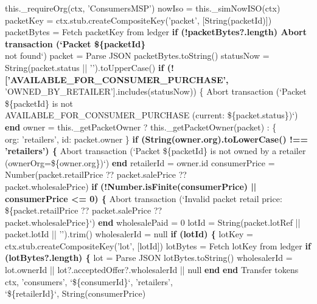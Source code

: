 \documentclass[12pt]{article}
\begin{document}
\begin{algorithm}[H]
\caption{purchasePacket() (Part 1 of 3)}
this.\_requireOrg(ctx, 'ConsumersMSP')\;
nowIso = this.\_simNowISO(ctx)\;
packetKey = ctx.stub.createCompositeKey('packet', [String(packetId)])\;
packetBytes = Fetch packetKey from ledger\;
\textbf{if (!packetBytes?.length) Abort transaction (`Packet \$\{packetId\}}\\
\quad not found`)\;
packet = Parse JSON packetBytes.toString()\;
statusNow = String(packet.status || '').toUpperCase()\;
\textbf{if (!['AVAILABLE\_FOR\_CONSUMER\_PURCHASE',}\\
\quad 'OWNED\_BY\_RETAILER'].includes(statusNow)) \{\;
Abort transaction (`Packet \$\{packetId\} is not\\
\quad AVAILABLE\_FOR\_CONSUMER\_PURCHASE (current: \$\{packet.status\})`)\;
\textbf{end}\;
owner = this.\_getPacketOwner ? this.\_getPacketOwner(packet) : \{\\
\quad org: 'retailers', id: packet.owner \}\;
\textbf{if (String(owner.org).toLowerCase() !== 'retailers') \{}\;
Abort transaction (`Packet \$\{packetId\} is not owned by a retailer\\
\quad (ownerOrg=\$\{owner.org\})`)\;
\textbf{end}\;
retailerId = owner.id\;
consumerPrice = Number(packet.retailPrice ?? packet.salePrice ??\\
\quad packet.wholesalePrice)\;
\textbf{if (!Number.isFinite(consumerPrice) || consumerPrice <= 0) \{}\;
Abort transaction (`Invalid packet retail price:\\
\quad \$\{packet.retailPrice ?? packet.salePrice ??\\
\quad packet.wholesalePrice\}`)\;
\textbf{end}\;
wholesalePaid = 0\;
lotId = String(packet.lotRef || packet.lotId || '').trim()\;
wholesalerId = null\;
\textbf{if (lotId) \{}\;
lotKey = ctx.stub.createCompositeKey('lot', [lotId])\;
lotBytes = Fetch lotKey from ledger\;
\textbf{if (lotBytes?.length) \{}\;
lot = Parse JSON lotBytes.toString()\;
wholesalerId = lot.ownerId || lot?.acceptedOffer?.wholesalerId || null\;
\textbf{end}\;
\textbf{end}\;
Transfer tokens ctx, 'consumers', `\$\{consumerId\}`, 'retailers',\\
\quad `\$\{retailerId\}`, String(consumerPrice)\;
\end{algorithm}
\end{document}
